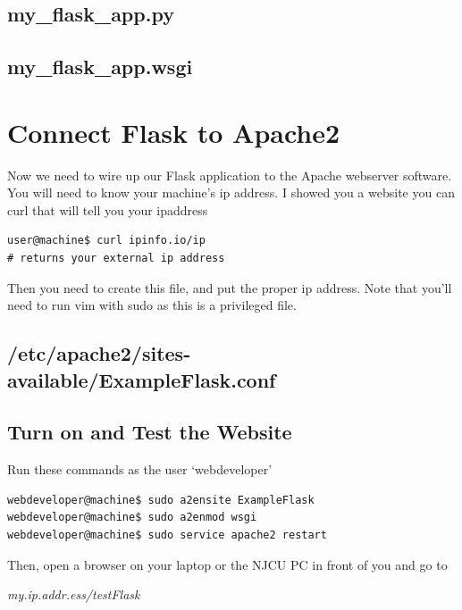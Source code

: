 \documentclass[10pt]{article}
\begin{document}
\subsection{my\_flask\_app.py}


\subsection{my\_flask\_app.wsgi}



\section{Connect Flask to Apache2}
Now we need to wire up our Flask application to the Apache webserver software. You will need to know your machine's ip address. I showed you a website you can curl that will tell you your ipaddress

\begin{lstlisting}
user@machine$ curl ipinfo.io/ip
# returns your external ip address
\end{lstlisting}

Then you need to create this file, and put the proper ip address. Note that you'll need to run vim with sudo as this is a privileged file.

\subsection{/etc/apache2/sites-available/ExampleFlask.conf}



\subsection{Turn on and Test the Website}
Run these commands as the user `webdeveloper'
\begin{lstlisting}
webdeveloper@machine$ sudo a2ensite ExampleFlask
webdeveloper@machine$ sudo a2enmod wsgi
webdeveloper@machine$ sudo service apache2 restart
\end{lstlisting}

Then, open a browser on your laptop or the NJCU PC in front of you and go to 

\begin{center}
\textit{my.ip.addr.ess/testFlask}
\end{center}
\end{document}
